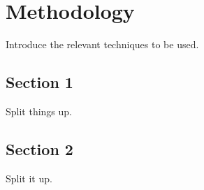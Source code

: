 \chapter{Methodology}

Introduce the relevant techniques to be used.

\section{Section 1}

Split things up.

\section{Section 2}

Split it up.


